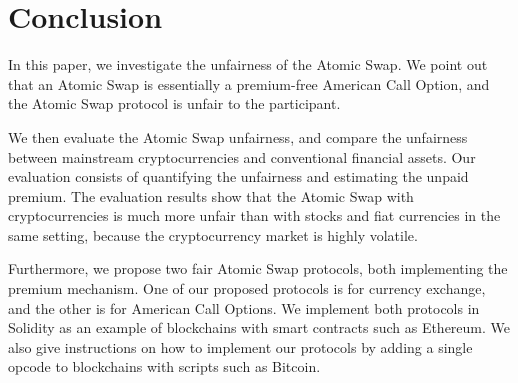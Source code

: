 \section{Conclusion}
\label{sec:conclusion}


In this paper, we investigate the unfairness of the Atomic Swap.
We point out that an Atomic Swap is essentially a premium-free American Call Option,
and the Atomic Swap protocol is unfair to the participant.

We then evaluate the Atomic Swap unfairness, and compare the unfairness between mainstream cryptocurrencies and conventional financial assets.
Our evaluation consists of quantifying the unfairness and estimating the unpaid premium.
The evaluation results show that the Atomic Swap with cryptocurrencies is much more unfair than with stocks and fiat currencies in the same setting, because the cryptocurrency market is highly volatile.

Furthermore, we propose two fair Atomic Swap protocols, both implementing the premium mechanism.
One of our proposed protocols is for currency exchange, and the other is for American Call Options.
We implement both protocols in Solidity as an example of blockchains with smart contracts such as Ethereum.
We also give instructions on how to implement our protocols by adding a single opcode to blockchains with scripts such as Bitcoin.